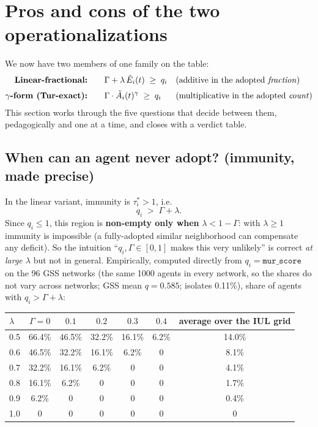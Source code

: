\documentclass[11pt,a4paper]{article}
\newcommand{\Ee}{\tilde{E}}                 %
\newcommand{\Acount}{\tilde{A}}             %
\newcommand{\code}[1]{\texttt{#1}}
\begin{document}
\section{Pros and cons of the two operationalizations}
\label{sec:proscons}

We now have two members of one family on the table:
\begin{align}
  \text{\textbf{Linear-fractional:}} \qquad & \Gamma + \lambda\, \Ee_i(t) \;\ge\; q_i
  && \text{(additive in the adopted \emph{fraction})}
  \label{eq:linvar}\\[2pt]
  \text{\textbf{$\gamma$-form (Tur-exact):}} \qquad & \Gamma \cdot \Acount_i(t)^{\gamma} \;\ge\; q_i
  && \text{(multiplicative in the adopted \emph{count})}
  \label{eq:gamvar}
\end{align}
This section works through the five questions that decide between them, pedagogically
and one at a time, and closes with a verdict table.

\subsection{When can an agent never adopt? (immunity, made precise)}
\label{sec:immunity}

In the linear variant, immunity is $\tau_i^{*} > 1$, i.e.
\begin{equation}
  q_i \;>\; \Gamma + \lambda .
\end{equation}
Since $q_i \le 1$, this region is \textbf{non-empty only when} $\lambda < 1 - \Gamma$:
with $\lambda \ge 1$ immunity is impossible (a fully-adopted similar neighborhood can
compensate any deficit). So the intuition ``$q_i, \Gamma \in [0,1]$ makes this very
unlikely'' is correct \emph{at large $\lambda$} but not in general. Empirically, computed
directly from $q_i = \code{mur\_score}$ on the 96 GSS networks (the same 1000 agents in
every network, so the shares do not vary across networks; GSS mean $q = 0.585$; isolates
0.11\%), share of agents with $q_i > \Gamma + \lambda$:

\begin{center}
\small
\begin{tabular}{@{}lcccccc@{}}
\toprule
$\lambda$ & $\Gamma = 0$ & $0.1$ & $0.2$ & $0.3$ & $0.4$ & average over the IUL grid \\
\midrule
0.5 & 66.4\% & 46.5\% & 32.2\% & 16.1\% & 6.2\% & 14.0\% \\
0.6 & 46.5\% & 32.2\% & 16.1\% & 6.2\% & 0 & 8.1\% \\
0.7 & 32.2\% & 16.1\% & 6.2\% & 0 & 0 & 4.1\% \\
0.8 & 16.1\% & 6.2\% & 0 & 0 & 0 & 1.7\% \\
0.9 & 6.2\% & 0 & 0 & 0 & 0 & 0.4\% \\
1.0 & 0 & 0 & 0 & 0 & 0 & 0 \\
\bottomrule
\end{tabular}
\end{center}
\end{document}
